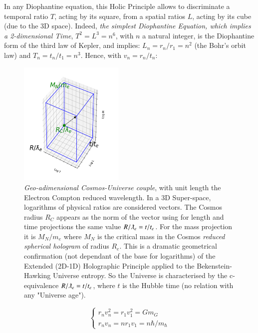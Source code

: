 \documentclass[a4paper,9pt]{article}
\begin{document}

In any Diophantine equation, this Holic Principle allows to discriminate a temporal ratio $T$, acting by its square, from a spatial ratios $L$, acting by its cube (due to the 3D space). Indeed, \textit {the simplest Diophantine Equation, which implies a 2-dimensional Time}, $T^2 = L^3 = n^6$, with $n$ a natural integer, is the Diophantine form of the third law of Kepler, and implies: $L_n = r_n /r_1 = n^2$ (the Bohr's orbit law) and $T_n = t_n/t_1 = n^3$. Hence, with $v_n = r_n/t_ n$:



\begin{figure}
\centering
\includegraphics[width=5cm,height=6cm]{./figure/triaxis.png}
\caption[Figure \ref{cuboid} MLT Adimensional cuboid]{\textit{Geo-adimensional Cosmos-Universe couple}, with unit length the Electron Compton reduced wavelength. In a 3D Super-space, logarithms of physical ratios are considered vectors. The Cosmos radius $ R_C$ appears as the norm of the vector using for length and time projections the same value $R/\lambdabar_e = t/t_e$. For the mass projection it is $M_N/m_e$ where $M_N$ is the critical mass in the Cosmos \textit{reduced spherical hologram} of radius $R_e$. This is a dramatic geometrical confirmation (not dependant of the base for logarithms) of the Extended (2D-1D) Holographic Principle applied to the Bekenstein-Hawking Universe entropy. So the Universe is characterised by the c-equivalence $R/\lambdabar_e = t/t_e$, where $t$ is the Hubble time (no relation with any "Universe age").} 
\label{cuboid}
\end{figure} 

 \begin{equation}
 \left\{
    \begin{array}{ll}
        r_nv_n^2 = r_1v_1^2 = Gm_G \\
        r_nv_n = nr_1v_1 = n \hbar/m_{\hbar}
    \end{array}
\right.
\end{equation}
\end{document}
